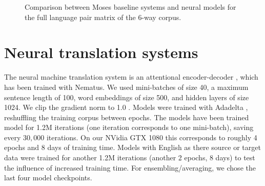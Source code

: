 \documentclass[11pt]{article}
\begin{document}
\begin{figure*}[p]
\centering
{}
\caption{Comparison between Moses baseline systems and neural models for the full language pair matrix of the 6-way corpus.}\label{pbsmtnmt1}
\end{figure*}

\section{Neural translation systems}

The neural machine translation system is an attentional encoder-decoder \cite{DBLP:journals/corr/BahdanauCB14}, which has been trained with Nematus.
We used mini-batches of size 40, a maximum sentence length of 100, word embeddings of size 500, and hidden layers of size 1024.
We clip the gradient norm to 1.0 \cite{DBLP:conf/icml/PascanuMB13}.
Models were trained with Adadelta \cite{DBLP:journals/corr/abs-1212-5701}, reshuffling the training corpus between epochs.
The models have been trained model for 1.2M iterations (one iteration corresponds to one mini-batch), saving every $30,000$ iterations. On our NVidia GTX 1080 this corresponds to roughly 4 epochs and 8 days of training time. Models with English as there source or target data were trained for another 1.2M iterations (another 2 epochs, 8 days) to test the influence of increased training time. For ensembling/averaging, we chose the last four model checkpoints.
\end{document}

